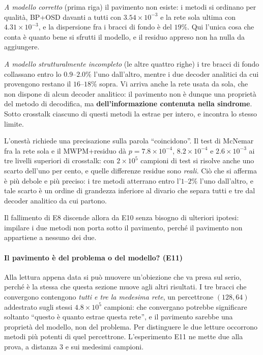 \emph{A modello corretto} (prima riga) il pavimento non esiste: i metodi si ordinano per qualità, BP+OSD davanti a tutti con $3.54\times10^{-3}$ e la rete sola ultima con $4.31\times10^{-3}$, e la dispersione fra i bracci di fondo è del $19\%$. Qui l'unica cosa che conta è quanto bene si sfrutti il modello, e il residuo appreso non ha nulla da aggiungere.

\emph{A modello strutturalmente incompleto} (le altre quattro righe) i tre bracci di fondo collassano entro lo $0.9$--$2.0\%$ l'uno dall'altro, mentre i due decoder analitici da cui provengono restano il $16$--$18\%$ sopra. Vi arriva anche la rete usata da sola, che non dispone di alcun decoder analitico: il pavimento non è dunque una proprietà del metodo di decodifica, ma \textbf{dell'informazione contenuta nella sindrome}. Sotto crosstalk ciascuno di questi metodi la estrae per intero, e incontra lo stesso limite.

L'onestà richiede una precisazione sulla parola ``coincidono''. Il test di McNemar fra la rete sola e il \ac{MWPM}+residuo dà $p = 7.8\times10^{-4}$, $8.2\times10^{-4}$ e $2.6\times10^{-3}$ ai tre livelli superiori di crosstalk: con $2\times10^{5}$ campioni di test si risolve anche uno scarto dell'uno per cento, e quelle differenze residue sono \emph{reali}. Ciò che si afferma è più debole e più preciso: i tre metodi atterrano entro l'$1$--$2\%$ l'uno dall'altro, e tale scarto è un ordine di grandezza inferiore al divario che separa tutti e tre dal decoder analitico da cui partono.

Il fallimento di E8 discende allora da E10 senza bisogno di ulteriori ipotesi: impilare i due metodi non porta sotto il pavimento, perché il pavimento non appartiene a nessuno dei due.

\paragraph{Il pavimento è del problema o del modello? (E11)}
Alla lettura appena data si può muovere un'obiezione che va presa sul serio, perché è la stessa che questa sezione muove agli altri risultati. I tre bracci che convergono contengono \emph{tutti e tre la medesima rete}, un percettrone $(128, 64)$ addestrato sugli stessi $4.8\times10^5$ campioni: che convergano potrebbe significare soltanto ``questo è quanto estrae questa rete'', e il pavimento sarebbe una proprietà del modello, non del problema. Per distinguere le due letture occorrono metodi più potenti di quel percettrone. L'esperimento E11 ne mette due alla prova, a distanza 3 e sui medesimi campioni.


